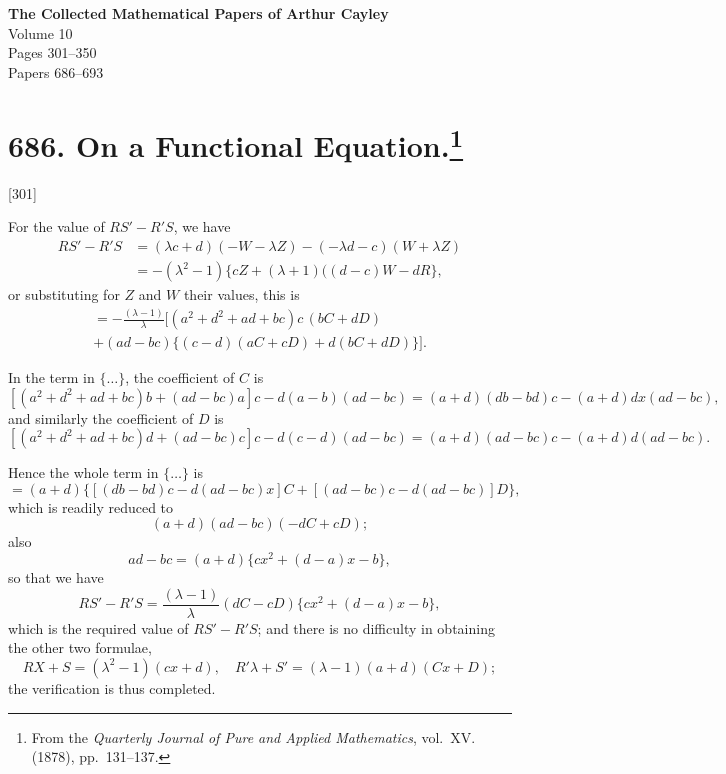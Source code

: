 \documentclass[12pt,a4paper]{article}
\theoremstyle{definition}
\begin{document}
\begin{center}
{\Large\bfseries The Collected Mathematical Papers of Arthur Cayley}\\[1em]
{\large Volume 10}\\[2em]
{\large Pages 301--350}\\[2em]
{\normalsize Papers 686--693}
\end{center}

\vspace{2em}

\tableofcontents
\newpage

\section[On a Functional Equation]{686. On a Functional Equation.\footnote{From the \textit{Quarterly Journal of Pure and Applied Mathematics}, vol.\ XV. (1878), pp.\ 131--137.}}

[301]


For the value of $RS' - R'S$, we have
\begin{align*}
RS' - R'S &= (\lambda c + d)(-W - \lambda Z) - (-\lambda d - c)(W + \lambda Z)\\
&= -(\lambda^2 - 1)\{cZ + (\lambda + 1)((d-c)W - dR\},
\end{align*}
or substituting for $Z$ and $W$ their values, this is
\begin{multline*}
= -\frac{(\lambda - 1)}{\lambda}\bigl[(a^2 + d^2 + ad + bc)c\,(bC + dD)\\
+ (ad - bc)\{(c-d)(aC + cD) + d(bC + dD)\}\bigr].
\end{multline*}

In the term in $\{\dots\}$, the coefficient of $C$ is
\[
[(a^2 + d^2 + ad + bc)b + (ad - bc)a]c - d(a - b)(ad - bc)
= (a + d)(db - bd)c - (a + d)dx(ad - bc),
\]
and similarly the coefficient of $D$ is
\[
[(a^2 + d^2 + ad + bc)d + (ad - bc)c]c - d(c - d)(ad - bc)
= (a + d)(ad - bc)c - (a + d)d(ad - bc).
\]

Hence the whole term in $\{\dots\}$ is
\[
= (a + d)\{[(db - bd)c - d(ad - bc)x]C + [(ad - bc)c - d(ad - bc)]D\},
\]
which is readily reduced to
\[
(a + d)(ad - bc)(-dC + cD);
\]
also
\[
ad - bc = (a + d)\{cx^2 + (d - a)x - b\},
\]
so that we have
\[
RS' - R'S = \frac{(\lambda - 1)}{\lambda}(dC - cD)\{cx^2 + (d - a)x - b\},
\]
which is the required value of $RS' - R'S$; and there is no difficulty in obtaining the other two formulae,
\[
RX + S = (\lambda^2 - 1)(cx + d),\quad R'\lambda + S' = (\lambda - 1)(a + d)(Cx + D);
\]
the verification is thus completed.
\end{document}
